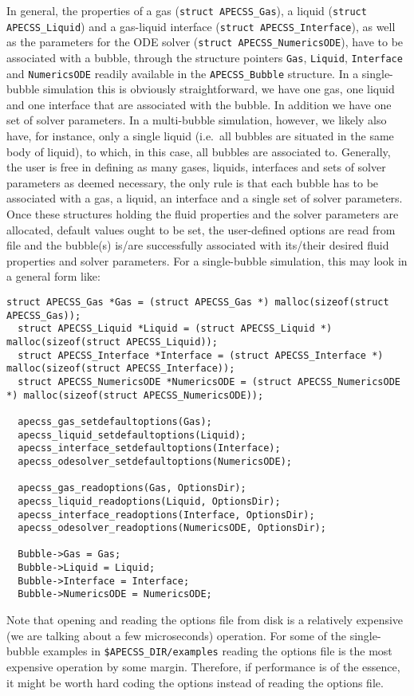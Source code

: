 In general, the properties of a gas ({\tt struct APECSS\_Gas}), a liquid ({\tt struct APECSS\_Liquid}) and a gas-liquid interface ({\tt struct APECSS\_Interface}), as well as the parameters for the ODE solver ({\tt struct APECSS\_NumericsODE}), have to be associated with a bubble, through the structure pointers {\tt *Gas}, {\tt *Liquid}, {\tt *Interface} and {\tt *NumericsODE} readily available in the {\tt APECSS\_Bubble} structure. In a single-bubble simulation this is obviously straightforward, we have one gas, one liquid and one interface that are associated with the bubble. In addition we have one set of solver parameters. In a multi-bubble simulation, however, we likely also have, for instance, only a single liquid (i.e.~all bubbles are situated in the same body of liquid), to which, in this case, all bubbles are associated to. Generally, the user is free in defining as many gases, liquids, interfaces and sets of solver parameters as deemed necessary, the only rule is that each bubble has to be associated with a gas, a liquid, an interface and a single set of solver parameters. Once these structures holding the fluid properties and the solver parameters are allocated, default values ought to be set, the user-defined options are read from file and the bubble(s) is/are successfully associated with its/their desired fluid properties and solver parameters. For a single-bubble simulation, this may look in a general form like:
\begin{lstlisting}[style=CStyle,numbers=none]
  struct APECSS_Gas *Gas = (struct APECSS_Gas *) malloc(sizeof(struct APECSS_Gas));
  struct APECSS_Liquid *Liquid = (struct APECSS_Liquid *) malloc(sizeof(struct APECSS_Liquid));
  struct APECSS_Interface *Interface = (struct APECSS_Interface *) malloc(sizeof(struct APECSS_Interface));
  struct APECSS_NumericsODE *NumericsODE = (struct APECSS_NumericsODE *) malloc(sizeof(struct APECSS_NumericsODE));

  apecss_gas_setdefaultoptions(Gas);
  apecss_liquid_setdefaultoptions(Liquid);
  apecss_interface_setdefaultoptions(Interface);
  apecss_odesolver_setdefaultoptions(NumericsODE);

  apecss_gas_readoptions(Gas, OptionsDir);
  apecss_liquid_readoptions(Liquid, OptionsDir);
  apecss_interface_readoptions(Interface, OptionsDir);
  apecss_odesolver_readoptions(NumericsODE, OptionsDir);

  Bubble->Gas = Gas;
  Bubble->Liquid = Liquid;
  Bubble->Interface = Interface;
  Bubble->NumericsODE = NumericsODE;
\end{lstlisting}\vspace{-0.75em}
Note that opening and reading the options file from disk is a relatively expensive (we are talking about a few microseconds) operation. For some of the single-bubble examples in {\tt \$APECSS\_DIR/examples} reading the options file is the most expensive operation by some margin. Therefore, if performance is of the essence, it might be worth hard coding the options instead of reading the options file.

